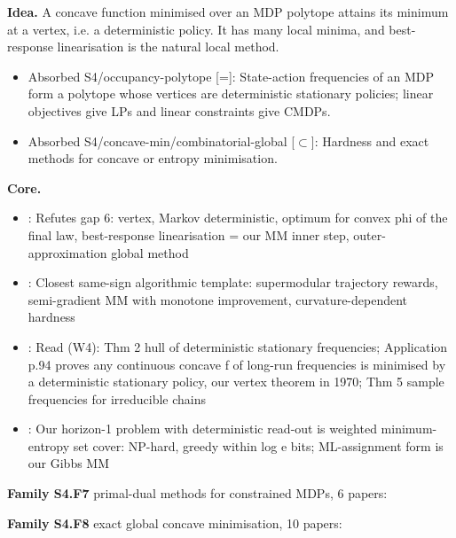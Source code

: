 \documentclass[10pt]{article}
\newcommand{\memb}[1]{\par\smallskip\textbf{#1}\quad}
\begin{document}
\textbf{Idea.} A concave function minimised over an MDP polytope attains its minimum at a vertex, i.e. a deterministic policy. It has many local minima, and best-response linearisation is the natural local method.
\begin{itemize}[nosep,leftmargin=1.2em]
\item Absorbed S4/occupancy-polytope [=]: State-action frequencies of an MDP form a polytope whose vertices are deterministic stationary policies; linear objectives give LPs and linear constraints give CMDPs.
\item Absorbed S4/concave-min/combinatorial-global [\ensuremath{\subset}]: Hardness and exact methods for concave or entropy minimisation.
\end{itemize}


\memb{Core.}
\begin{itemize}[nosep,leftmargin=1.2em]
\item \citet{Collins-using97}: Refutes gap 6: vertex, Markov deterministic, optimum for convex phi of the final law, best-response linearisation = our MM inner step, outer-approximation global method
\item \citet{DeSanti-global24}: Closest same-sign algorithmic template: supermodular trajectory rewards, semi-gradient MM with monotone improvement, curvature-dependent hardness
\item \citet{Derman-finite70ch7}: Read (W4): Thm 2 hull of deterministic stationary frequencies; Application p.94 proves any continuous concave f of long-run frequencies is minimised by a deterministic stationary policy, our vertex theorem in 1970; Thm 5 sample frequencies for irreducible chains
\item \citet{Cardinal-minimum10}: Our horizon-1 problem with deterministic read-out is weighted minimum-entropy set cover: NP-hard, greedy within log e bits; ML-assignment form is our Gibbs MM
\end{itemize}
\memb{Family S4.F7} primal-dual methods for constrained MDPs, 6 papers: {\footnotesize \citetext{\citealp{Ding-convergence22}; \citealp{Jain-towards22}; \citealp{Ding-lastiterate23}; \citealp{Moskovitz-reload23}; \citealp{Grontas-operator24}; \citealp{Kitamura-policy24}}}

\memb{Family S4.F8} exact global concave minimisation, 10 papers: {\footnotesize \citetext{\citealp{Horst-global90}; \citealp{Sinha-general22}; \citealp{Falk-successive76}; \citealp{Matheiss-survey80}; \citealp{Tuy-concave85}; \citealp{Falk-concave86}; \citealp{Pardalos-methods86}; \citealp{Avis-pivoting92}; \citealp{Benson-concave95}; \citealp{vomDahl-solving19}}}
\end{document}
